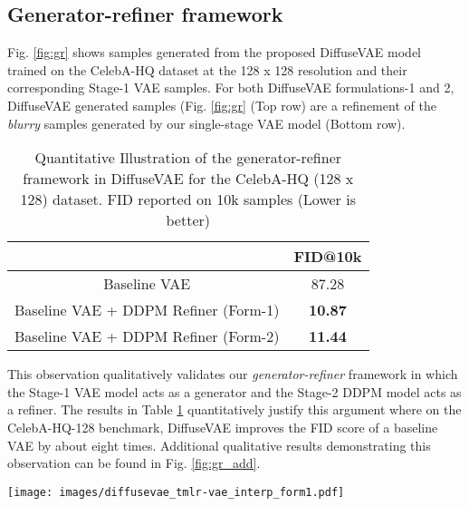 \documentclass[10pt]{article} \usepackage[accepted]{tmlr}
\begin{document}
\subsection{Generator-refiner framework}

Fig. \ref{fig:gr} shows samples generated from the proposed DiffuseVAE model trained on the CelebA-HQ dataset at the 128 x 128 resolution and their corresponding Stage-1 VAE samples. For both DiffuseVAE formulations-1 and 2, DiffuseVAE generated samples (Fig. \ref{fig:gr} (Top row) are a refinement of the \textit{blurry} samples generated by our single-stage VAE model (Bottom row).

\begin{table}[H]
\small
\centering
\begin{tabular}{@{}cc@{}}
\toprule
                    & FID@10k  \\ \midrule
Baseline VAE        & 87.28   \\
Baseline VAE + DDPM Refiner (Form-1) & \textbf{10.87}   \\
Baseline VAE + DDPM Refiner (Form-2) & \textbf{11.44}   \\ \bottomrule
\end{tabular}
\caption{Quantitative Illustration of the generator-refiner framework in DiffuseVAE for the CelebA-HQ (128 x 128) dataset. FID reported on 10k samples (Lower is better)}
\label{table:gr}
\end{table}

This observation qualitatively validates our \textit{generator-refiner} framework in which the Stage-1 VAE model acts as a generator and the Stage-2 DDPM model acts as a refiner. The results in Table \ref{table:gr} quantitatively justify this argument where on the CelebA-HQ-128 benchmark, DiffuseVAE improves the FID score of a baseline VAE by about eight times. Additional qualitative results demonstrating this observation can be found in Fig. \ref{fig:gr_add}.

\begin{figure*}
  \centering
    \texttt{[image: images/diffusevae\_tmlr-vae\_interp\_form1.pdf]}
    \caption{DiffuseVAE samples generated by linearly interpolating in the VAE latent space (Formulation-1, T=1000).  denotes the interpolation factor. \emph{Middle row:} VAE generated interpolation between two samples. \emph{Top row:} Corresponding DDPM refinements for VAE samples in the Middle Row. \emph{Bottom row:} DDPM refinements for VAE samples in the Middle Row with shared DDPM stochasticity among all samples.}
    \label{fig:interpolate_vae}
\end{figure*}
\end{document}
